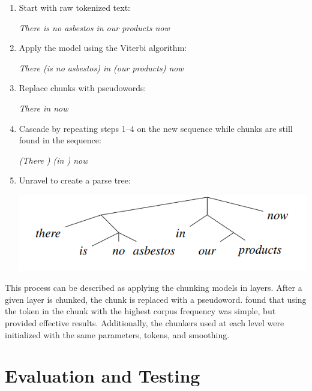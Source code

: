 \documentclass[11pt,a4paper]{article}
\begin{document}
\begin{enumerate}
	\item Start with raw tokenized text:
		
	\begin{center}\emph{There is no asbestos in our products now}\end{center}	
	
	\item Apply the model using the Viterbi algorithm:	
	
	\begin{center}\emph{There (is no asbestos) in (our products) now}\end{center}	
	
	\item Replace chunks with pseudowords:	
	
	\begin{center}\emph{There  in  now}\end{center}	
	
	\item Cascade by repeating steps 1--4 on the new sequence while chunks are still found in the sequence:
	
	\begin{center}\emph{(There ) (in ) now}\end{center}
	
	\item Unravel to create a parse tree:	
	
	\includegraphics[width=\linewidth]{parse_tree_example.png}
\end{enumerate}

This process can be described as applying the chunking models in layers.
After a given layer is chunked, the chunk is replaced with a pseudoword.
\citet{ponvert-etal-2011-simple} found that using the token in the chunk with the highest corpus frequency was simple, but provided effective results.
Additionally, the chunkers used at each level were initialized with the same parameters, tokens, and smoothing.

\section{Evaluation and Testing}
\end{document}
